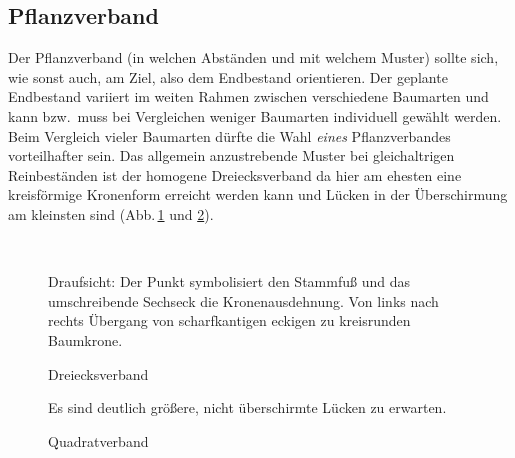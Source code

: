 \documentclass[twocolumn]{scrartcl}
\begin{document}
\subsection{Pflanzverband}

Der Pflanzverband (in welchen Abständen und mit welchem Muster) sollte sich, wie
sonst auch, am Ziel, also dem Endbestand orientieren. Der geplante Endbestand
variiert im weiten Rahmen zwischen verschiedene Baumarten und kann bzw.\ muss
bei Vergleichen weniger Baumarten individuell gewählt werden. Beim Vergleich
vieler Baumarten dürfte die Wahl \emph{eines} Pflanzverbandes vorteilhafter
sein. Das allgemein anzustrebende Muster bei gleichaltrigen Reinbeständen ist
der homogene Dreiecksverband da hier am ehesten eine kreisförmige Kronenform
erreicht werden kann und Lücken in der Überschirmung am kleinsten sind
(Abb.\,\ref{fig:dreiecksverband} und \ref{fig:quadratverband}).

\begin{figure}[htbp]
  \centering
  \\
  \caption{Dreiecksverband}
  \footnotesize{Draufsicht: Der Punkt symbolisiert den Stammfuß und das umschreibende Sechseck die Kronenausdehnung. Von links nach rechts Übergang von scharfkantigen eckigen zu kreisrunden Baumkrone.}
  \label{fig:dreiecksverband}
\end{figure}

\begin{figure}[htbp]
  \centering
  \caption{Quadratverband}
  \footnotesize{Es sind deutlich größere, nicht überschirmte Lücken zu erwarten.}
  \label{fig:quadratverband}
\end{figure}
\end{document}
